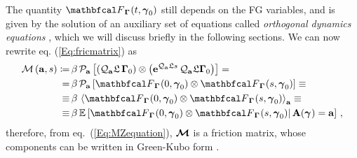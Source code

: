 \documentclass[10pt,a4paper]{book}
\theoremstyle{definition}
\begin{document}
The quantity $\fprojbf_{\Bphase{}}(t,\Aphase{0})$ still depends on the FG variables, and is given by the solution of an auxiliary set of equations called \emph{orthogonal dynamics equations} \cite{Givon2005}, which we will discuss briefly in the following sections.  
We can now rewrite eq. (\ref{Eq:fricmatrix}) as
\begin{align}\label{Eq:FRICmatrixRF}
 \nonumber
 \fricmat\cip{\bfa,s} \coloneqq& 
   \,\beta\,\pproj_{\bfa}\sqp{ \cip{ \qproj_{\bfa}\Lio\,\Bphase{0}} \otimes 
   \cip{ \exp{\qproj_{\bfa}\Lio s}\,\qproj_{\bfa}\Lio\Bphase{0} } } = {}\\ 
 \nonumber
 =& \,\beta\, \pproj_{\bfa} \sqp{ \fprojbf_{\Bphase{}}(0,\Aphase{0}) \otimes \fprojbf_{\Bphase{}}(s,\Aphase{0}) } \equiv{}\\
 \nonumber
 \equiv& \,\beta\, \aver{ \fprojbf_{\Bphase{}}(0,\Aphase{0}) \otimes \fprojbf_{\Bphase{}}(s,\Aphase{0}) }_{\bfa} \equiv{}\\
 \equiv& \,\beta\, \cexpval{ \fprojbf_{\Bphase{}}(0,\Aphase{0}) \otimes \fprojbf_{\Bphase{}}(s,\Aphase{0}) }{ \,\bfA(\Aphase{})=\bfa }\,,
\end{align}
therefore, from eq.~(\ref{Eq:MZequation}), $\boldsymbol{\mathcal{M}}$ is a friction matrix, whose components can be written in Green-Kubo form \cite{Kauzlaric2011}.
\end{document}
